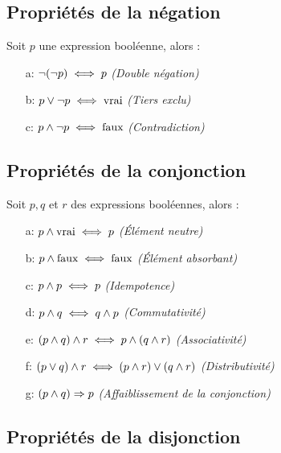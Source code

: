 \documentclass[12]{article}%
\theoremstyle{plain}
\theoremstyle{definition}
\theoremstyle{remark}
\begin{document}
\vspace{1em}
\subsection{Propriétés de la négation}

Soit \( p \) une expression booléenne, alors :

\begin{itemize}[label=, leftmargin=1cm]
	\item[a:] \( \neg(\neg p) \iff p \hfill \) \textit{(Double négation)}
	\item[b:] \( p \lor \neg p \iff \text{vrai} \hfill \) \textit{(Tiers exclu)}
	\item[c:] \( p \land \neg p \iff \text{faux} \hfill \) \textit{(Contradiction)}
\end{itemize}

\vspace{1em}

\subsection{Propriétés de la conjonction}

Soit \( p, q \) et \( r \) des expressions booléennes, alors :

\begin{itemize}[label=, leftmargin=1cm]
	\item[a:] \( p \land \text{vrai} \iff p \hfill \) \textit{(Élément neutre)}
	\item[b:] \( p \land \text{faux} \iff \text{faux} \hfill \) \textit{(Élément absorbant)}
	\item[c:] \( p \land p \iff p \hfill \) \textit{(Idempotence)}
	\item[d:] \( p \land q \iff q \land p \hfill \) \textit{(Commutativité)}
	\item[e:] \( (p \land q) \land r \iff p \land (q \land r) \hfill \) \textit{(Associativité)}
	\item[f:] \( (p \lor q) \land r \iff (p \land r) \lor (q \land r) \hfill \) \textit{(Distributivité)}
	\item[g:] \( (p \land q) \Rightarrow p \hfill \) \textit{(Affaiblissement de la conjonction)}
\end{itemize}

\vspace{1em}
\subsection{Propriétés de la disjonction}
\end{document}
